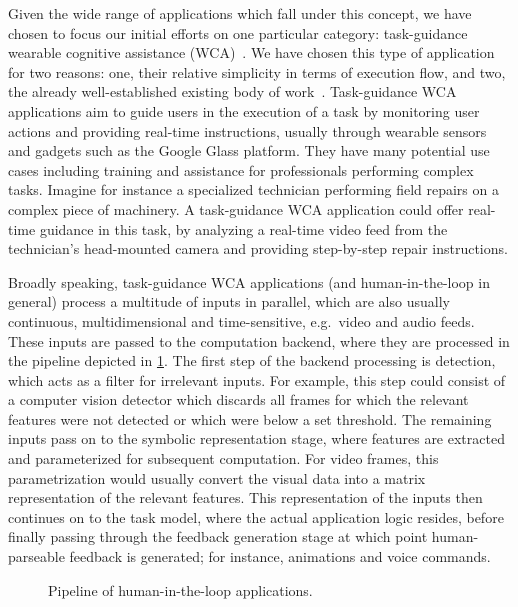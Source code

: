 Given the wide range of applications which fall under this concept, we have chosen to focus our initial efforts on one particular category: task-guidance wearable cognitive assistance (WCA)~\cite{Ha:TowardsWearableCogAssist}.
We have chosen this type of application for two reasons: one, their relative simplicity in terms of execution flow, and two, the already well-established existing body of work~\cite{Ha:TowardsWearableCogAssist,Chen:EarlyImplementation,Chen:AnEmpiricalStudyOfLatency}.
Task-guidance WCA applications aim to guide users in the execution of a task by monitoring user actions and providing real-time instructions, usually through wearable sensors and gadgets such as the Google Glass platform.
They have many potential use cases including training and assistance for professionals performing complex tasks.
Imagine for instance a specialized technician performing field repairs on a complex piece of machinery.
A task-guidance WCA application could offer real-time guidance in this task, by analyzing a real-time video feed from the technician's head-mounted camera and providing step-by-step repair instructions.

Broadly speaking, task-guidance WCA applications (and human-in-the-loop in general) process a multitude of inputs in parallel, which are also usually continuous, multidimensional and time-sensitive, e.g.\ video and audio feeds.
These inputs are passed to the computation backend, where they are processed in the pipeline depicted in \cref{fig:pipeline2}.
The first step of the backend processing is detection, which acts as a filter for irrelevant inputs.
For example, this step could consist of a computer vision detector which discards all frames for which the relevant features were not detected or which were below a set threshold.
The remaining inputs pass on to the symbolic representation stage, where features are extracted and parameterized for subsequent computation.
For video frames, this parametrization would usually convert the visual data into a matrix representation of the  relevant features.
This representation of the inputs then continues on to the task model, where the actual application logic resides, before finally passing through the feedback generation stage at which point human-parseable feedback is generated; for instance, animations and voice commands.

\begin{figure}[b]
    \centering
    
    \caption{Pipeline of human-in-the-loop applications.}\label{fig:pipeline2}
\end{figure}

